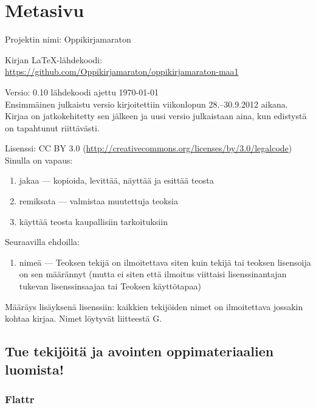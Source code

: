 \newpage

\section*{Metasivu}

Projektin nimi: Oppikirjamaraton

Kirjan LaTeX-lähdekoodi: \\
\url{https://github.com/Oppikirjamaraton/oppikirjamaraton-maa1}

Versio: 0.10 \qquad lähdekoodi ajettu \today \\
Ensimmäinen julkaistu versio kirjoitettiin viikonlopun 28.--30.9.2012 aikana. Kirjaa on jatkokehitetty sen jälkeen ja uusi versio julkaistaan aina, kun edistystä on tapahtunut riittävästi.

Lisenssi: CC BY 3.0 (\url{http://creativecommons.org/licenses/by/3.0/legalcode})\\
Sinulla on vapaus:
\begin{enumerate}
\item jakaa — kopioida, levittää, näyttää ja esittää teosta
\item remiksata — valmistaa muutettuja teoksia
\item käyttää teosta kaupallisiin tarkoituksiin
\end{enumerate}
Seuraavilla ehdoilla:
\begin{enumerate}
\item nimeä — Teoksen tekijä on ilmoitettava siten kuin tekijä tai teoksen lisensoija on sen määrännyt (mutta ei siten että ilmoitus viittaisi lisenssinantajan tukevan lisenssinsaajaa tai Teoksen käyttötapaa)
\end{enumerate}

Määräys lisäyksenä lisenssiin: kaikkien tekijöiden nimet on ilmoitettava jossakin kohtaa kirjaa. Nimet löytyvät liitteestä G.

\subsection*{Tue tekijöitä ja avointen oppimateriaalien luomista!}

\subsubsection*{Flattr}



